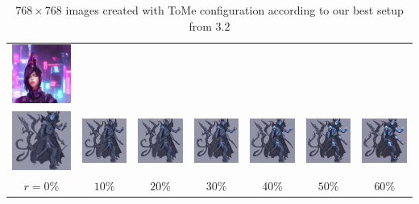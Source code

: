 \begin{table}[!htb]
\begin{tabular}{c c@{}c@{}c@{}c@{}c@{}c}
    \includegraphics[width=0.135\linewidth]{chapter/appendix/def_imgs/cyberpunk/c_60.png} \\
    \includegraphics[width=0.135\linewidth]{chapter/appendix/def_imgs/tiefling/t_0.png} &
    \includegraphics[width=0.135\linewidth]{chapter/appendix/def_imgs/tiefling/t_10.png} &
    \includegraphics[width=0.135\linewidth]{chapter/appendix/def_imgs/tiefling/t_20.png} &
    \includegraphics[width=0.135\linewidth]{chapter/appendix/def_imgs/tiefling/t_30.png} &
    \includegraphics[width=0.135\linewidth]{chapter/appendix/def_imgs/tiefling/t_40.png} &
    \includegraphics[width=0.135\linewidth]{chapter/appendix/def_imgs/tiefling/t_50.png} &
    \includegraphics[width=0.135\linewidth]{chapter/appendix/def_imgs/tiefling/t_60.png} \\
    \(r=0\%\) & \(10\%\) & \(20\%\) & \(30\%\) & \(40\%\) & \(50\%\) & \(60\%\) \\
\end{tabular}
\caption{$768 \times 768$ images created with ToMe configuration according to our best setup from \(3.2\)}
\end{table}